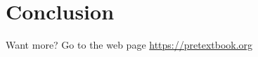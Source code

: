 \documentclass[11pt, oneside]{article}   	%
\begin{document}
%
%
%
%
%
%
%
%

\section{Conclusion}


Want more? Go to the web page \url{https://pretextbook.org}

	
\end{document}
